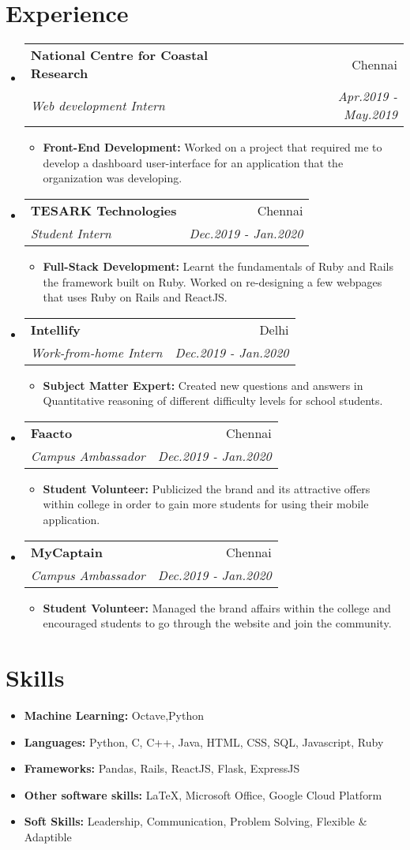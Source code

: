 \documentclass[letterpaper,12pt]{article}
\makeatletter
\newcommand{\resumeItem}[2]{
\item\small{
\textbf{#1}{ #2 \vspace{-2pt}}
}
}
\newcommand{\resumeSubheading}[4]{
\vspace{-1pt}\item
\begin{tabular*}{0.97\textwidth}{l@{\extracolsep{\fill}}r}
\textbf{#1} & #2 \\
\textit{\small#3} & \textit{\small #4} \\
\end{tabular*}\vspace{-5pt}
}
\newcommand{\resumeSubHeadingListStart}{\begin{itemize}[leftmargin=*]}
\newcommand{\resumeSubHeadingListEnd}{\end{itemize}}
\newcommand{\resumeItemListStart}{\begin{itemize}}
\newcommand{\resumeItemListEnd}{\end{itemize}\vspace{-5pt}}
\makeatother
\begin{document}
\section{Experience}
\resumeSubHeadingListStart
\resumeSubheading
{National Centre for Coastal Research}{Chennai}
{Web development Intern}{Apr.2019 - May.2019}
\resumeItemListStart
\resumeItem{Front-End Development:}
{Worked on a project that required me to develop a dashboard user-interface for an application that the organization was developing.}
\resumeItemListEnd
\resumeSubheading
{TESARK Technologies}{Chennai}
{Student Intern}{Dec.2019 - Jan.2020}
\resumeItemListStart
\resumeItem{Full-Stack Development:}
{Learnt the fundamentals of Ruby and Rails the framework built on Ruby. Worked on re-designing a few webpages that uses Ruby on Rails and ReactJS.}
\resumeItemListEnd
\resumeSubheading
{Intellify}{Delhi}
{Work-from-home Intern}{Dec.2019 - Jan.2020}
\resumeItemListStart
\resumeItem{Subject Matter Expert:}
{Created new questions and answers in Quantitative reasoning of different difficulty levels for school students.}
\resumeItemListEnd
\resumeSubheading
{Faacto}{Chennai}
{Campus Ambassador}{Dec.2019 - Jan.2020}
\resumeItemListStart
\resumeItem{Student Volunteer:}
{Publicized the brand and its attractive offers within college in order to gain more students for using their mobile application.}
\resumeItemListEnd
\resumeSubheading
{MyCaptain}{Chennai}
{Campus Ambassador}{Dec.2019 - Jan.2020}
\resumeItemListStart
\resumeItem{Student Volunteer:}{
Managed the brand affairs within the college and encouraged students to go through the website and join the community.}
\resumeItemListEnd
\resumeSubHeadingListEnd

\section{Skills}
\resumeSubHeadingListStart
\resumeItem{Machine Learning:}{Octave,Python}
\resumeItem{Languages:}{Python, C, C++, Java, HTML, CSS, SQL, Javascript, Ruby}
\resumeItem{Frameworks:}{Pandas, Rails, ReactJS, Flask, ExpressJS}
\resumeItem{Other software skills:}{LaTeX, Microsoft Office, Google Cloud Platform}
\resumeItem{Soft Skills:}{Leadership, Communication, Problem Solving, Flexible \& Adaptible} 
\resumeSubHeadingListEnd
\end{document}
